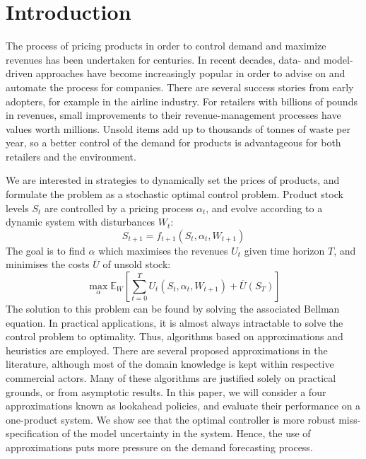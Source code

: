 \documentclass[main.tex]{subfiles}
\begin{document}
\section{Introduction}
The process of pricing products in order to control demand and
maximize revenues has been undertaken for centuries. In recent
decades, data- and model-driven approaches have become increasingly
popular in order to advise on and automate the process for companies.
There are several success stories from early adopters, for example in
the airline industry.
For retailers with billions of pounds in revenues, small
improvements to their revenue-management processes have values worth millions.
Unsold items add up to thousands of tonnes of waste per year, so
a better control of the demand for products is advantageous
for both retailers and the environment.

We are interested in strategies to dynamically set the prices of products, and
formulate the problem as a stochastic optimal control problem.
Product stock levels $S_t$ are controlled by a pricing process
$\alpha_t$, and evolve according to a dynamic system with disturbances
$W_t$:
\begin{equation}
S_{t+1}=f_{t+1}(S_t,\alpha_t,W_{t+1})
\end{equation}
The goal is to find $\alpha$ which maximises the revenues $U_t$
given time horizon $T$, and
minimises the costs $\overline{U}$ of unsold stock:
\begin{equation}
  \max_{\alpha}\mathbb E_W\left[ \sum_{t=0}^TU_t(S_t,\alpha_t,W_{t+1})
  + \overline{U}(S_T)\right]
\end{equation}
The solution to this problem can be found by solving the associated
Bellman equation. In practical applications, it is almost always
intractable to solve the control problem to optimality.
Thus, algorithms based on approximations and heuristics are employed.
There are several proposed approximations in the
literature, although most of the domain knowledge is kept within
respective commercial actors.
Many of these algorithms are justified solely on practical grounds, or
from asymptotic results.
In this paper, we will consider a four approximations known as
lookahead policies,
and evaluate their performance on a one-product system.
We show see that the optimal controller is more robust
miss-specification of the model uncertainty in the system.
Hence, the use of approximations puts more pressure on the
demand forecasting process.
\end{document}
